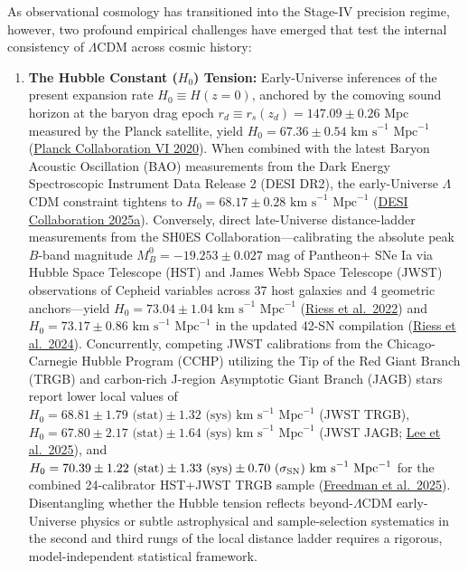 \documentclass[11pt,letterpaper]{article}
\begin{document}
As observational cosmology has transitioned into the Stage-IV precision regime, however, two profound empirical challenges have emerged that test the internal consistency of $\Lambda$CDM across cosmic history:

\begin{enumerate}
    \setlength{\itemsep}{3pt}
    \item \textbf{The Hubble Constant ($H_0$) Tension:} Early-Universe inferences of the present expansion rate $H_0 \equiv H(z=0)$, anchored by the comoving sound horizon at the baryon drag epoch $r_d \equiv r_s(z_d) = 147.09 \pm 0.26\text{ Mpc}$ measured by the Planck satellite, yield $H_0 = 67.36 \pm 0.54\text{ km s}^{-1}\text{ Mpc}^{-1}$ (\href{https://arxiv.org/abs/1807.06209}{Planck Collaboration VI 2020}). When combined with the latest Baryon Acoustic Oscillation (BAO) measurements from the Dark Energy Spectroscopic Instrument Data Release 2 (DESI DR2), the early-Universe $\Lambda$CDM constraint tightens to $H_0 = 68.17 \pm 0.28\text{ km s}^{-1}\text{ Mpc}^{-1}$ (\href{https://arxiv.org/abs/2503.14738}{DESI Collaboration 2025a}). Conversely, direct late-Universe distance-ladder measurements from the SH0ES Collaboration---calibrating the absolute peak $B$-band magnitude $M_B^0 = -19.253 \pm 0.027\text{ mag}$ of Pantheon+ SNe Ia via Hubble Space Telescope (HST) and James Webb Space Telescope (JWST) observations of Cepheid variables across 37 host galaxies and 4 geometric anchors---yield $H_0 = 73.04 \pm 1.04\text{ km s}^{-1}\text{ Mpc}^{-1}$ (\href{https://arxiv.org/pdf/2112.04510}{Riess et al.\ 2022}) and $H_0 = 73.17 \pm 0.86\text{ km s}^{-1}\text{ Mpc}^{-1}$ in the updated 42-SN compilation (\href{https://arxiv.org/abs/2408.11770}{Riess et al.\ 2024}). Concurrently, competing JWST calibrations from the Chicago-Carnegie Hubble Program (CCHP) utilizing the Tip of the Red Giant Branch (TRGB) and carbon-rich J-region Asymptotic Giant Branch (JAGB) stars report lower local values of $H_0 = 68.81 \pm 1.79\text{ (stat)} \pm 1.32\text{ (sys)}\text{ km s}^{-1}\text{ Mpc}^{-1}$ (JWST TRGB), $H_0 = 67.80 \pm 2.17\text{ (stat)} \pm 1.64\text{ (sys)}\text{ km s}^{-1}\text{ Mpc}^{-1}$ (JWST JAGB; \href{https://arxiv.org/abs/2408.03474}{Lee et al.\ 2025}), and $H_0 = 70.39 \pm 1.22\text{ (stat)} \pm 1.33\text{ (sys)} \pm 0.70\text{ ($\sigma_{\rm SN}$)}\text{ km s}^{-1}\text{ Mpc}^{-1}$ for the combined 24-calibrator HST+JWST TRGB sample (\href{https://arxiv.org/abs/2408.06153}{Freedman et al.\ 2025}). Disentangling whether the Hubble tension reflects beyond-$\Lambda$CDM early-Universe physics or subtle astrophysical and sample-selection systematics in the second and third rungs of the local distance ladder requires a rigorous, model-independent statistical framework.

\end{enumerate}
\end{document}
